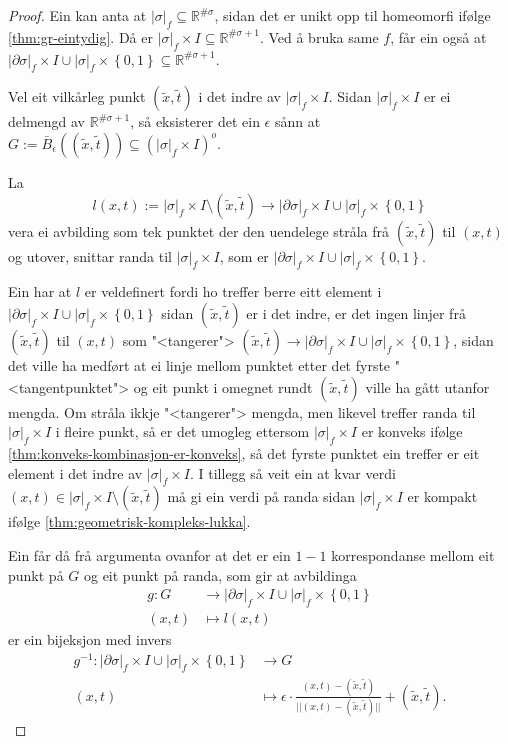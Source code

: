 \documentclass[a4paper, 12pt, norsk]{article}
\theoremstyle{plain}
\theoremstyle{definition}
\newcommand{\Rb}{\mathbb{R}}
\newcommand{\union}{ \mathop{\cup}\limits }
\newcommand{\gr}[1]{ \lvert #1 \rvert } %
\newcommand{\set}[1]{ \left\{ #1 \right\} } %
\newcommand{\tuple}[1]{ \left( #1 \right) } %
\begin{document}
\begin{proof}
	Ein kan anta at \( \gr{\sigma}_f \subseteq \Rb^{\#\sigma} \), sidan det er unikt opp til homeomorfi ifølge \autoref{thm:gr-eintydig}. Då er \( \gr{\sigma}_f \times I \subseteq \Rb^{\#\sigma+1} \). Ved å bruka same \( f \), får ein også at \( \gr{\partial\sigma}_f \times I \union \gr{\sigma}_f \times \set{0, 1} \subseteq \Rb^{\#\sigma+1} \).

	Vel eit vilkårleg punkt \( \tuple{\tilde{x}, \tilde{t}} \) i det indre av \( \gr{\sigma}_f \times I \). Sidan \( \gr{\sigma}_f \times I \) er ei delmengd av \( \Rb^{\#\sigma+1} \), så eksisterer det ein \( \epsilon \) sånn at \( G := \bar{B}_{\epsilon}\tuple{\tuple{\tilde{x}, \tilde{t}}} \subseteq \tuple{\gr{\sigma}_f \times I}^o \).
	
	La
	\[
		l(x,t) := \gr{\sigma}_f \times I \setminus \tuple{\tilde{x}, \tilde{t}} \to \gr{\partial\sigma}_f \times I \union \gr{\sigma}_f \times \set{0, 1}
	\] 
	vera ei avbilding som tek punktet der den uendelege stråla frå \( \tuple{\tilde{x}, \tilde{t}} \) til \( \tuple{x,t} \) og utover, snittar randa til \( \gr{\sigma}_f \times I \), som er \( \gr{\partial\sigma}_f \times I \union \gr{\sigma}_f \times \set{0, 1} \).

	Ein har at \( l \) er veldefinert fordi ho treffer berre eitt element i \( \gr{\partial\sigma}_f \times I \union \gr{\sigma}_f \times \set{0, 1} \) sidan \( \tuple{\tilde{x}, \tilde{t}} \) er i det indre, er det ingen linjer frå \( \tuple{\tilde{x}, \tilde{t}} \) til \( \tuple{x,t} \) som "<tangerer"> \( \tuple{\tilde{x}, \tilde{t}} \to \gr{\partial\sigma}_f \times I \union \gr{\sigma}_f \times \set{0, 1} \), sidan det ville ha medført at ei linje mellom punktet etter det fyrste "<tangentpunktet"> og eit punkt i omegnet rundt \( \tuple{\tilde{x}, \tilde{t}} \) ville ha gått utanfor mengda. Om stråla ikkje "<tangerer"> mengda, men likevel treffer randa til \( \gr{\sigma}_f \times I \) i fleire punkt, så er det umogleg ettersom \( \gr{\sigma}_f \times I \) er konveks ifølge \autoref{thm:konveks-kombinasjon-er-konveks}, så det fyrste punktet ein treffer er eit element i det indre av \( \gr{\sigma}_f \times I \). I tillegg så veit ein at kvar verdi \( (x,t) \in \gr{\sigma}_f \times I \setminus \tuple{\tilde{x}, \tilde{t}} \) må gi ein verdi på randa sidan \( \gr{\sigma}_f \times I \) er kompakt ifølge \autoref{thm:geometrisk-kompleks-lukka}.

	Ein får då frå argumenta ovanfor at det er ein \( 1 - 1 \) korrespondanse mellom eit punkt på \( G \) og eit punkt på randa, som gir at avbildinga
	\begin{align*}
		g: G &\to \gr{\partial\sigma}_f \times I \union \gr{\sigma}_f \times \set{0, 1} \\
		(x, t) &\mapsto l(x,t)
	\end{align*}
	er ein bijeksjon med invers
	\begin{align*}
		g^{-1}: \gr{\partial\sigma}_f \times I \union \gr{\sigma}_f \times \set{0, 1} &\to G \\
		(x, t) &\mapsto \epsilon\cdot\frac{(x,t)-\tuple{\tilde{x}, \tilde{t}}}{||(x,t)-\tuple{\tilde{x}, \tilde{t}}||} + \tuple{\tilde{x}, \tilde{t}}.
	\end{align*}
	

\end{proof}
\end{document}
